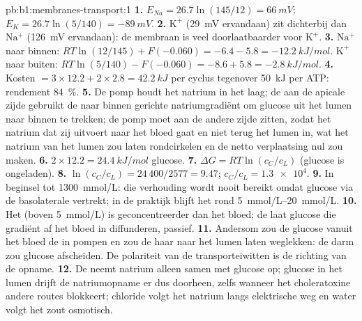 \begin{solution}{pb:b1:membranes-transport:1}
\textbf{1.} $E_{Na} = 26.7\ln(145/12) = \qty{+66}{mV}$; $E_K =
26.7\ln(5/140) = \qty{-89}{mV}$.
\textbf{2.} $\mathrm{K^+}$ (\qty{29}{mV} ervandaan) zit dichterbij dan
$\mathrm{Na^+}$ (\qty{126}{mV} ervandaan): de membraan is veel doorlaatbaarder
voor $\mathrm{K^+}$.
\textbf{3.} $\mathrm{Na^+}$ naar binnen: $RT\ln(12/145) + F(-0.060) = -6.4 -
5.8 = \qty{-12.2}{kJ/mol}$. $\mathrm{K^+}$ naar buiten: $RT\ln(5/140) -
F(-0.060) = -8.6 + 5.8 = \qty{-2.8}{kJ/mol}$.
\textbf{4.} Kosten $= 3\times 12.2 + 2\times 2.8 = \qty{42.2}{kJ}$ per cyclus
tegenover \qty{50}{kJ} per ATP: rendement \qty{84}{\%}.
\textbf{5.} De pomp houdt het natrium in het  laag; de  aan de
apicale zijde gebruikt de naar binnen gerichte natriumgradiënt om glucose uit het
lumen naar binnen te trekken; de pomp moet aan de andere zijde zitten, zodat het
natrium dat zij uitvoert naar het bloed gaat en niet terug het lumen in, wat het
natrium van het lumen zou laten rondcirkelen en de netto verplaatsing nul zou
maken.
\textbf{6.} $2\times 12.2 = \qty{24.4}{kJ/mol}$ glucose.
\textbf{7.} $\Delta G = RT\ln(c_C/c_L)$ (glucose is ongeladen).
\textbf{8.} $\ln(c_C/c_L) = 24\,400/2577 = 9.47$; $c_C/c_L =
\num{1.3e4}$.
\textbf{9.} In beginsel tot \qty{1300}{mmol/L}: die verhouding wordt nooit
bereikt omdat glucose via de basolaterale  vertrekt; in de praktijk blijft
het  rond \qtyrange{5}{20}{mmol/L}.
\textbf{10.} Het  (boven \qty{5}{mmol/L}) is geconcentreerder dan het
bloed; de  laat glucose die gradiënt af het bloed in diffunderen,
passief.
\textbf{11.} Andersom zou de  glucose vanuit het bloed de  in pompen
en zou de  haar naar het lumen laten weglekken: de darm zou glucose
afscheiden. De polariteit van de transporteiwitten is de richting van de opname.
\textbf{12.} De  neemt natrium alleen samen met glucose op; glucose in
het lumen drijft de natriumopname er dus doorheen, zelfs wanneer het choleratoxine
andere routes blokkeert; chloride volgt het natrium langs elektrische weg en water
volgt het zout osmotisch.

\end{solution}
